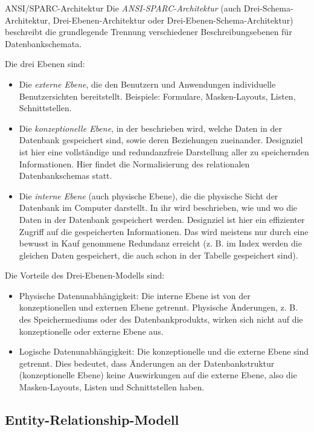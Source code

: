 \begin{defi}{ANSI/SPARC-Architektur}
    Die \emph{ANSI-SPARC-Architektur} (auch Drei-Schema-Architektur, Drei-Ebenen-Architektur oder Drei-Ebenen-Schema-Architektur) beschreibt die grundlegende Trennung verschiedener Beschreibungsebenen für Datenbankschemata.

    Die drei Ebenen sind:
    \begin{itemize}
        \item Die \emph{externe Ebene}, die den Benutzern und Anwendungen individuelle Benutzersichten bereitstellt. Beispiele: Formulare, Masken-Layouts, Listen, Schnittstellen.
        \item Die \emph{konzeptionelle Ebene}, in der beschrieben wird, welche Daten in der Datenbank gespeichert sind, sowie deren Beziehungen zueinander. Designziel ist hier eine vollständige und redundanzfreie Darstellung aller zu speichernden Informationen.
              Hier findet die Normalisierung des relationalen Datenbankschemas statt.
        \item Die \emph{interne Ebene} (auch physische Ebene), die die physische Sicht der Datenbank im Computer darstellt.
              In ihr wird beschrieben, wie und wo die Daten in der Datenbank gespeichert werden.
              Designziel ist hier ein effizienter Zugriff auf die gespeicherten Informationen.
              Das wird meistens nur durch eine bewusst in Kauf genommene Redundanz erreicht (z. B. im Index werden die gleichen Daten gespeichert, die auch schon in der Tabelle gespeichert sind).
    \end{itemize}

    Die Vorteile des Drei-Ebenen-Modells sind:
    \begin{itemize}
        \item Physische Datenunabhängigkeit: Die interne Ebene ist von der konzeptionellen und externen Ebene getrennt. Physische Änderungen, z. B. des Speichermediums oder des Datenbankprodukts, wirken sich nicht auf die konzeptionelle oder externe Ebene aus.
        \item Logische Datenunabhängigkeit: Die konzeptionelle und die externe Ebene sind getrennt.
              Dies bedeutet, dass Änderungen an der Datenbankstruktur (konzeptionelle Ebene) keine Auswirkungen auf die externe Ebene, also die Masken-Layouts, Listen und Schnittstellen haben.
    \end{itemize}
\end{defi}

\subsection{Entity-Relationship-Modell}

